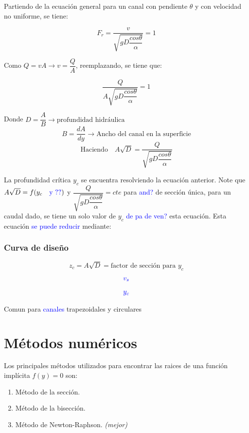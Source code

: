 \documentclass[11pt, oneside]{article}
\begin{document}
Partiendo de la ecuación general para un canal con pendiente $\theta$ y con velocidad no uniforme, se tiene:

\begin{equation}
    F_{r}=\dfrac{v}{\sqrt{gD\dfrac{cos\theta}{\alpha}}}=1
\end{equation}

Como  $Q=vA\rightarrow v=\dfrac{Q}{A}$, reemplazando, se tiene que:

\begin{equation}
    \dfrac{Q}{A\sqrt{gD\dfrac{cos\theta}{\alpha}}}=1
\end{equation}

Donde $D=\dfrac{A}{B}\rightarrow \text{profundidad hidráulica}$
$$B=\dfrac{dA}{dy}\rightarrow \text{Ancho del canal en la superficie}$$
$$\text{Haciendo} \quad A\sqrt{D}=\dfrac{Q}{\sqrt{gD\dfrac{cos\theta}{\alpha}}}$$

La profundidad crítica $y_c$ se encuentra resolviendo la ecuación anterior. Note que $A\sqrt{D}=f(y_c \quad \text{\textcolor{blue}{y ??}})$ y $\dfrac{Q}{\sqrt{gD\dfrac{cos\theta}{\alpha}}}=cte$ para \textcolor{blue}{and?} de sección única, para un caudal dado, se tiene un solo valor de $y_{c}$ \textcolor{blue}{de pa de ven?} esta ecuación. Esta ecuación \textcolor{blue}{se puede reducir} mediante:

\subsubsection{Curva de diseño}

$$z_{c}=A\sqrt{D}=\text{factor de sección para $y_c$}$$ 
$$\textcolor{blue}{v_{s}}$$
$$\textcolor{blue}{y_{c}}$$

Comun para \textcolor{blue}{canales} trapezoidales y circulares

\section{Métodos numéricos}

Los principales métodos utilizados para encontrar las raices de una función implícita $f(y)=0$ son:

\begin{enumerate}
    \item Método de la sección.
    \item Método de la bisección.
    \item Método de Newton-Raphson. \textit{(mejor)}
\end{enumerate}
\end{document}
